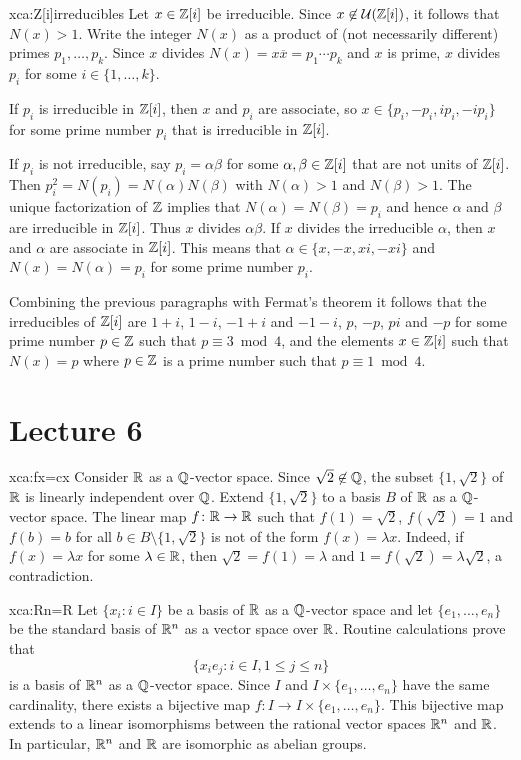 \begin{sol}{xca:Z[i]irreducibles}
	Let $x\in\mathbb{Z}[i]$ be irreducible. Since 
	$x\not\in\mathcal{U}(\mathbb{Z}[i])$, it follows that $N(x)>1$. Write
	the integer $N(x)$ as a product of (not necessarily different) primes $p_1,\dots,p_k$. Since 
	$x$ divides $N(x)=x\overline{x}=p_1\cdots p_k$ and $x$ is prime, 
	$x$ divides $p_i$ for some $i\in\{1,\dots,k\}$. 
	
	If $p_i$ is irreducible in $\mathbb{Z}[i]$, 
	then $x$ and $p_i$ are associate, so $x\in\{p_i,-p_i,ip_i,-ip_i\}$ for some
	prime number $p_i$ that is irreducible in $\mathbb{Z}[i]$. 
	
	If $p_i$ is not irreducible, say $p_i=\alpha\beta$ for some $\alpha,\beta\in\mathbb{Z}[i]$ that
	are not units of $\mathbb{Z}[i]$. Then 
	$p_i^2=N(p_i)=N(\alpha)N(\beta)$ with $N(\alpha)>1$ and $N(\beta)>1$. The unique factorization
	of $\mathbb{Z}$ implies that $N(\alpha)=N(\beta)=p_i$ and hence $\alpha$ and $\beta$ 
	are irreducible in $\mathbb{Z}[i]$. Thus $x$ divides 
	$\alpha\beta$. If $x$ divides the irreducible $\alpha$, 
	then $x$ and $\alpha$ are associate in $\mathbb{Z}[i]$. This means that 
	$\alpha\in\{x,-x,xi,-xi\}$ and $N(x)=N(\alpha)=p_i$ for some prime number $p_i$.  
	
	Combining the previous paragraphs with Fermat's theorem it follows that 
	the irreducibles of $\mathbb{Z}[i]$ are $1+i$, $1-i$, $-1+i$ and $-1-i$, 
	$p$, $-p$, $pi$ and $-p$ for some prime number $p\in\mathbb{Z}$ such that $p\equiv3\bmod 4$, and 
	the elements $x\in\mathbb{Z}[i]$ such that $N(x)=p$ where $p\in\mathbb{Z}$ is a prime number such that $p\equiv1\bmod 4$. 
\end{sol}

\section*{Lecture 6}

\begin{sol}{xca:fx=cx}
    Consider $\mathbb{R}$ as a $\mathbb{Q}$-vector space. 
    Since $\sqrt{2}\not\in\mathbb{Q}$, the subset $\{1,\sqrt{2}\}$ of $\mathbb{R}$ 
    is linearly independent 
    over $\mathbb{Q}$. Extend $\{1,\sqrt{2}\}$ 
    to a basis $B$ of $\mathbb{R}$ as a $\mathbb{Q}$-vector space. The
    linear map $f\colon\mathbb{R}\to\mathbb{R}$ such that
    $f(1)=\sqrt{2}$, $f(\sqrt{2})=1$ and $f(b)=b$ for all $b\in B\setminus\{1,\sqrt{2}\}$ 
    is not of the form $f(x)=\lambda x$. Indeed, if $f(x)=\lambda x$ for some $\lambda\in\mathbb{R}$, 
    then $\sqrt{2}=f(1)=\lambda$ and $1=f(\sqrt{2})=\lambda\sqrt{2}$, a contradiction. 
\end{sol}

\begin{sol}{xca:Rn=R}
    Let $\{x_i:i\in I\}$ be a basis of $\mathbb{R}$ as a $\mathbb{Q}$-vector space and
    let $\{e_1,\dots,e_n\}$ be the standard basis of $\mathbb{R}^n$ as a vector space over $\mathbb{R}$. 
    Routine calculations prove that  
    \[
    \{x_ie_j:i\in I,1\leq j\leq n\}
    \]
    is a basis of $\mathbb{R}^n$ as a $\mathbb{Q}$-vector space. 
    Since
    $I$ and $I\times\{e_1,\dots,e_n\}$ have the same cardinality, 
    there exists a bijective map $f\colon I\to I\times\{e_1,\dots,e_n\}$. This bijective
    map extends to a linear isomorphisms between the rational vector spaces 
    $\mathbb{R}^n$ and
    $\mathbb{R}$. In particular, $\mathbb{R}^n$ and 
    $\mathbb{R}$ are isomorphic as abelian groups. 
\end{sol}

